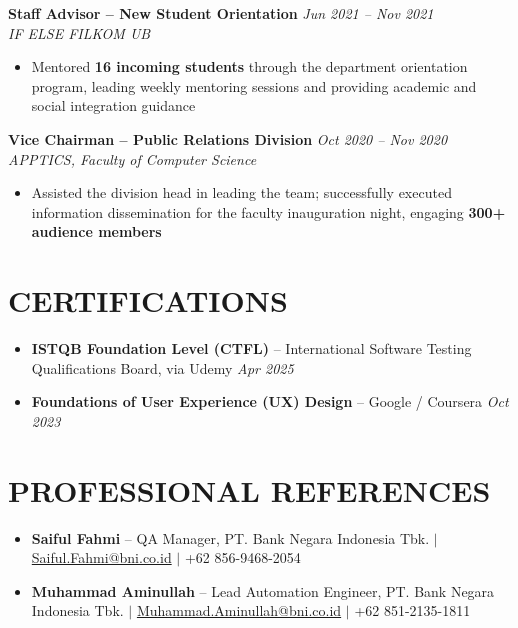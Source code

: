 \documentclass[10pt,a4paper]{article}
\newcommand{\experience}[4]{%
    \noindent\textbf{#1} \hfill \textit{#2}\\
    \textit{#3} \hfill #4\vspace{2pt}
}
\begin{document}
\vspace{4pt}

\experience{Staff Advisor -- New Student Orientation}{Jun 2021 -- Nov 2021}{IF ELSE FILKOM UB}{}
\begin{itemize}
    \item Mentored \textbf{16 incoming students} through the department orientation program, leading weekly mentoring sessions and providing academic and social integration guidance
\end{itemize}

\vspace{4pt}

\experience{Vice Chairman -- Public Relations Division}{Oct 2020 -- Nov 2020}{APPTICS, Faculty of Computer Science}{}
\begin{itemize}
    \item Assisted the division head in leading the team; successfully executed information dissemination for the faculty inauguration night, engaging \textbf{300+ audience members}
\end{itemize}

\vspace{2pt}

\section*{CERTIFICATIONS}

\begin{itemize}
    \item \textbf{ISTQB Foundation Level (CTFL)} -- International Software Testing Qualifications Board, via Udemy \hfill \textit{Apr 2025}
    \item \textbf{Foundations of User Experience (UX) Design} -- Google / Coursera \hfill \textit{Oct 2023}
\end{itemize}

\vspace{2pt}

\section*{PROFESSIONAL REFERENCES}

\begin{itemize}
    \item \textbf{Saiful Fahmi} -- QA Manager, PT. Bank Negara Indonesia Tbk. $\mid$ \href{mailto:Saiful.Fahmi@bni.co.id}{Saiful.Fahmi@bni.co.id} $\mid$ +62 856-9468-2054
    \item \textbf{Muhammad Aminullah} -- Lead Automation Engineer, PT. Bank Negara Indonesia Tbk. $\mid$ \href{mailto:Muhammad.Aminullah@bni.co.id}{Muhammad.Aminullah@bni.co.id} $\mid$ +62 851-2135-1811
\end{itemize}
\end{document}

